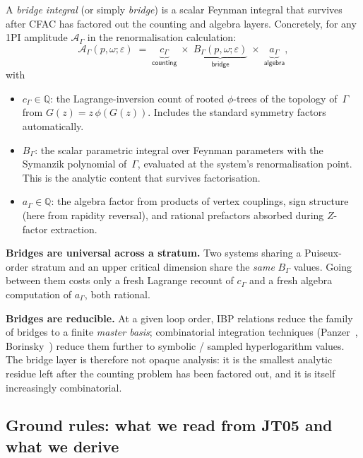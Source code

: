 \documentclass[11pt,a4paper]{article}
\theoremstyle{definition}
\theoremstyle{plain}
\begin{document}
\begin{cfacbox}
A \emph{bridge integral} (or simply \emph{bridge}) is a scalar Feynman
integral that survives after CFAC has factored out the counting and
algebra layers.  Concretely, for any 1PI amplitude $\mathcal{A}_\Gamma$
in the renormalisation calculation:
\begin{equation}\label{eq:factorisation-def}
  \mathcal{A}_\Gamma(p,\omega; \varepsilon)
  \;=\; \underbrace{c_\Gamma}_{\textsf{counting}}
   \;\times\; \underbrace{B_\Gamma(p,\omega;\varepsilon)}_{\textsf{bridge}}
   \;\times\; \underbrace{a_\Gamma}_{\textsf{algebra}},
\end{equation}
with
\begin{itemize}[leftmargin=2em]
  \item $c_\Gamma \in \mathbb{Q}$: the Lagrange-inversion count of
    rooted $\phi$-trees of the topology of~$\Gamma$ from
    $G(z) = z\,\phi(G(z))$.  Includes the standard symmetry factors
    automatically.
  \item $B_\Gamma$: the scalar parametric integral over Feynman
    parameters with the Symanzik polynomial of~$\Gamma$, evaluated at
    the system's renormalisation point.  This is the analytic content
    that survives factorisation.
  \item $a_\Gamma \in \mathbb{Q}$: the algebra factor from products of
    vertex couplings, sign structure (here from rapidity reversal),
    and rational prefactors absorbed during $Z$-factor extraction.
\end{itemize}
\textbf{Bridges are universal across a stratum.}  Two systems sharing a
Puiseux-order stratum and an upper critical dimension share the
\emph{same} $B_\Gamma$ values.  Going between them costs only a fresh
Lagrange recount of $c_\Gamma$ and a fresh algebra computation of
$a_\Gamma$, both rational.

\textbf{Bridges are reducible.}  At a given loop order, IBP relations
\cite{Smirnov2012} reduce the family of bridges to a finite
\emph{master basis}; combinatorial integration techniques
(Panzer~\cite{Panzer2014}, Borinsky~\cite{Borinsky2020}) reduce them
further to symbolic / sampled hyperlogarithm values.  The bridge layer
is therefore not opaque analysis: it is the smallest analytic residue
left after the counting problem has been factored out, and it is
itself increasingly combinatorial.
\end{cfacbox}

\subsection{Ground rules: what we read from JT05 and what we derive}
\label{sec:ground-rules}
\end{document}
